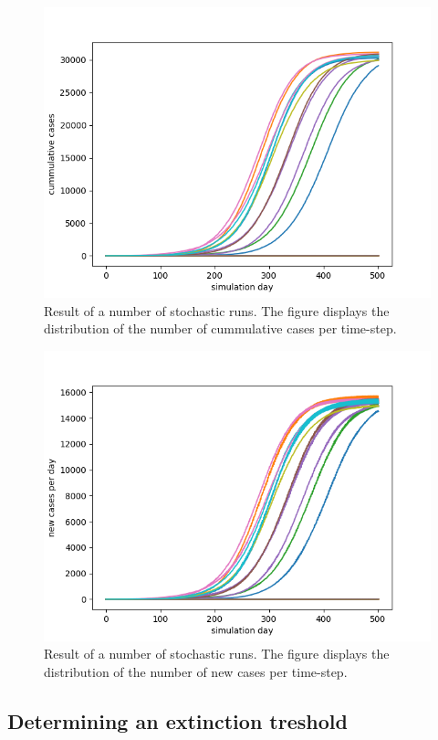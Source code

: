 \documentclass[runningheads]{llncs}
\begin{document}
\begin{figure}
	\includegraphics[width=\textwidth]{fig1.png}
	\caption{Result of a number of stochastic runs. The figure displays the distribution of the number of cummulative cases per time-step.} 	
	\label{fig1}
\end{figure}

\begin{figure}
	\includegraphics[width=\textwidth]{fig2.png}
	\caption{Result of a number of stochastic runs. The figure displays the distribution of the number of new cases per time-step.} 
	\label{fig2}
\end{figure}


\subsection{Determining an extinction treshold}
\end{document}

